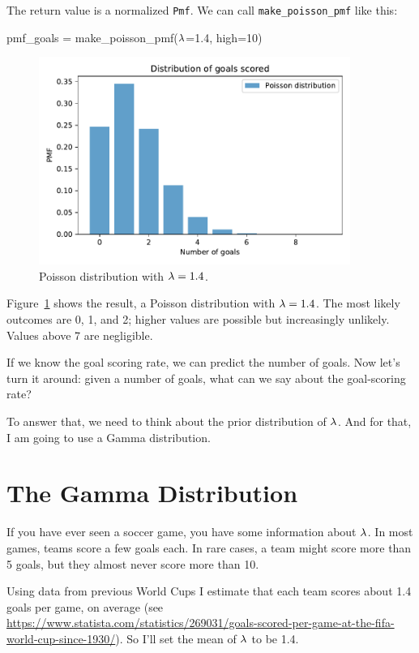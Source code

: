 \documentclass[12pt]{book}
\theoremstyle{exercise}
\newcommand{\py}[1]{{\tt #1}}%
\begin{document}
The return value is a normalized \py{Pmf}.
We can call \py{make_poisson_pmf} like this:

\begin{code}
pmf_goals = make_poisson_pmf($\mathtt{\lambda}$=1.4, high=10)
\end{code}


\begin{figure}
\centerline{\includegraphics[width=4in]{figs/fig07-01.pdf}}
\caption{Poisson distribution with $\mathtt{\lambda}=1.4$.}
\label{fig07-01}
\end{figure}

Figure~\ref{fig07-01} shows the result, a Poisson distribution with $\mathtt{\lambda}=1.4$.
The most likely outcomes are 0, 1, and 2; higher values are possible but increasingly unlikely.
Values above 7 are negligible.

If we know the goal scoring rate, we can predict the number of goals.
Now let's turn it around: given a number of goals, what can we say about the goal-scoring rate?

To answer that, we need to think about the prior distribution of $\mathtt{\lambda}$.
And for that, I am going to use a Gamma distribution.


\section{The Gamma Distribution}

If you have ever seen a soccer game, you have some information about $\mathtt{\lambda}$.
In most games, teams score a few goals each.
In rare cases, a team might score more than 5 goals, but they almost never score more than 10.

Using data from previous World Cups
I estimate that each team scores about 1.4 goals per game, on average (see \url{https://www.statista.com/statistics/269031/goals-scored-per-game-at-the-fifa-world-cup-since-1930/}).  So I'll set the mean of $\mathtt{\lambda}$ to be 1.4.
\end{document}

